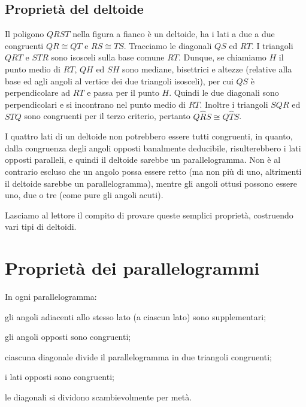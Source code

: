 \subsection{Proprietà del deltoide}

\noindent\begin{minipage}{0.7\textwidth}\parindent15pt
Il poligono $QRST$ nella figura a fianco è un deltoide, ha i lati a due a due congruenti $QR\cong QT$ e $RS\cong TS$. Tracciamo le diagonali $QS$ ed $RT$. I triangoli $QRT$ e $STR$ sono isosceli sulla base comune $RT$. Dunque, se chiamiamo $H$ il punto medio di $RT$, $QH$ ed $SH$ sono mediane, bisettrici e altezze (relative alla base ed agli angoli al vertice dei due triangoli isosceli), per cui $QS$ è perpendicolare ad $RT$ e passa per il punto $H$. Quindi le due diagonali sono perpendicolari e si incontrano nel punto medio di $RT$. Inoltre i triangoli $SQR$ ed $STQ$ sono congruenti per il terzo criterio, pertanto $Q\widehat{R}S\cong Q\widehat{T}S$.
\end{minipage}\hfil
\begin{minipage}{0.3\textwidth}
	\centering
\end{minipage}

I quattro lati di un deltoide non potrebbero essere tutti congruenti, in quanto, dalla congruenza degli angoli opposti banalmente deducibile, risulterebbero i lati opposti paralleli, e quindi il deltoide sarebbe un parallelogramma. Non è al contrario escluso che un angolo possa essere retto (ma non più di uno, altrimenti il deltoide sarebbe un parallelogramma), mentre gli angoli ottusi possono essere uno, due o tre (come pure gli angoli acuti).

Lasciamo al lettore il compito di provare queste semplici proprietà, costruendo vari tipi di deltoidi.


\section{Proprietà dei parallelogrammi}

\begin{teorema}
In ogni parallelogramma:
\begin{enumerate*}
\item gli angoli adiacenti allo stesso lato (a ciascun lato) sono supplementari;
\item gli angoli opposti sono congruenti;
\item ciascuna diagonale divide il parallelogramma in due triangoli congruenti;
\item i lati opposti sono congruenti;
\item le diagonali si dividono scambievolmente per metà. 
\end{enumerate*}
\end{teorema}

